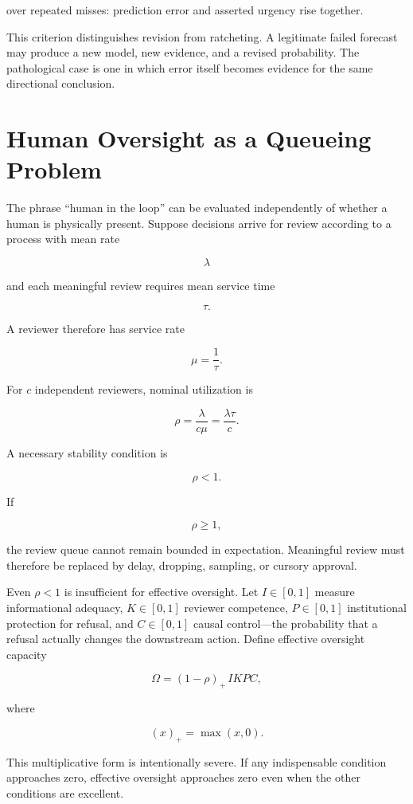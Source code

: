 \documentclass[11pt]{article}
\begin{document}
over repeated misses: prediction error and asserted urgency rise together.

This criterion distinguishes revision from ratcheting. A legitimate failed
forecast may produce a new model, new evidence, and a revised probability.
The pathological case is one in which error itself becomes evidence for the
same directional conclusion.


\section{Human Oversight as a Queueing Problem}

The phrase ``human in the loop'' can be evaluated independently of whether a
human is physically present. Suppose decisions arrive for review according to
a process with mean rate

\[
\lambda
\]

and each meaningful review requires mean service time

\[
\tau.
\]

A reviewer therefore has service rate

\[
\mu=\frac{1}{\tau}.
\]

For \(c\) independent reviewers, nominal utilization is

\[
\rho
=
\frac{\lambda}{c\mu}
=
\frac{\lambda\tau}{c}.
\]

A necessary stability condition is

\[
\rho<1.
\]

If

\[
\rho\geq1,
\]

the review queue cannot remain bounded in expectation. Meaningful review must
therefore be replaced by delay, dropping, sampling, or cursory approval.

Even \(\rho<1\) is insufficient for effective oversight. Let \(I\in[0,1]\)
measure informational adequacy, \(K\in[0,1]\) reviewer competence,
\(P\in[0,1]\) institutional protection for refusal, and \(C\in[0,1]\) causal
control---the probability that a refusal actually changes the downstream
action. Define effective oversight capacity

\[
\Omega
=
(1-\rho)_{+}\, I K P C,
\]

where

\[
(x)_{+}=\max(x,0).
\]

This multiplicative form is intentionally severe. If any indispensable
condition approaches zero, effective oversight approaches zero even when the
other conditions are excellent.
\end{document}
